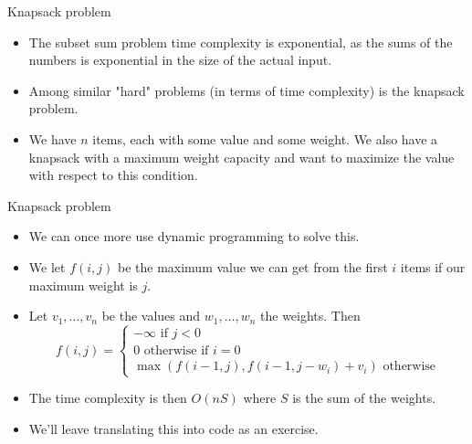 \documentclass{beamer}
\begin{document}
\begin{frame}[plain]{Knapsack problem}
    \vspace{10pt}

    \begin{itemize}
        \item The subset sum problem time complexity is exponential, as the sums of the numbers is exponential in the size of the actual input. 
        
        \item Among similar "hard" problems (in terms of time complexity) is the knapsack problem.
        
        \item We have $n$ items, each with some value and some weight. We also have a knapsack with a maximum weight capacity and want to maximize the value with respect to this condition.
    \end{itemize}
\end{frame}

\begin{frame}[plain]{Knapsack problem}
    \vspace{10pt}

    \begin{itemize}
        \item We can once more use dynamic programming to solve this.
        
        \item We let $f(i, j)$ be the maximum value we can get from the first $i$ items if our maximum weight is $j$.
       
       	\item Let $v_1, \dots, v_n$ be the values and $w_1, \dots, w_n$ the weights. Then 	
       	\[f(i, j) = \begin{cases}-\infty \text{ if } j < 0\\0 \text{ otherwise if } i = 0\\ \operatorname{max}(f(i - 1, j), f(i - 1, j - w_i) + v_i) \text{ otherwise}\end{cases}\]
       	\item The time complexity is then $O(nS)$ where $S$ is the sum of the weights.
       	\item We'll leave translating this into code as an exercise.
    \end{itemize}
\end{frame}
\end{document}
